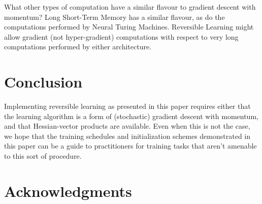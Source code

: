 \documentclass{article}
\begin{document}
What other types of computation have a similar flavour to gradient descent with momentum?
Long Short-Term Memory has a similar flavour, as do the computations performed by Neural Turing Machines.
Reversible Learning might allow gradient (not hyper-gradient) computations with respect to very long computations performed by either architecture.

\section{Conclusion}

Implementing reversible learning as presented in this paper requires either that the learning algorithm is a form of (stochastic) gradient descent with momentum, and that Hessian-vector products are available.
Even when this is not the case, we hope that the training schedules and initialization schemes demonstrated in this paper can be a guide to practitioners for training tasks that aren't amenable to this sort of procedure.

\section*{Acknowledgments} 




\end{document}
